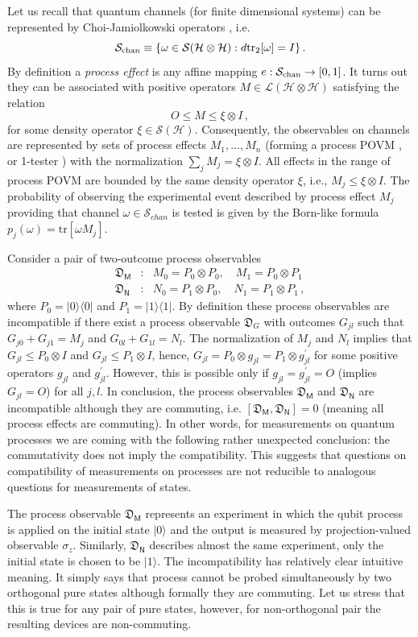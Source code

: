 \documentclass[12pt]{iopart}
\theoremstyle{definition}
\newcommand{\hi}{\mathcal{H}} %
\newcommand{\ket}[1]{|#1\rangle} %
\newcommand{\bra}[1]{\langle#1|} %
\renewcommand{\tr}[1]{\textrm{tr}\left[#1\right]} %
\newcommand{\Mo}{\mathsf{M}}%
\newcommand{\No}{\mathsf{N}}%
\newcommand{\Dev}{\mathfrak{D}} %
\begin{document}
{Let us recall that quantum channels (for finite dimensional systems) can be 
represented by Choi-Jamiolkowski operators \cite{MLQT12}, i.e. 
$$
\mathcal{S}_{\rm chan}\equiv\{\omega\in\mathcal{S}(\hi\otimes\hi): d{\rm tr}_2[\omega]=I\} \, .
$$
By definition a \emph{process effect} is any affine mapping 
$e:\mathcal{S}_{\rm chan}\to[0,1]$. It turns out \cite{Jencova12} 
they can be associated with positive operators $M\in \mathcal{L}(\hi\otimes\hi)$ satisfying the relation
$$
O\leq M\leq \xi\otimes I\,,
$$
for some density operator $\xi\in\mathcal{S}(\hi)$. Consequently, the
observables on channels are represented by sets of process effects 
$M_1,\dots,M_n$ (forming
a process POVM \cite{Ziman08a}, or 1-tester \cite{ChDaPe09pra}) 
with the normalization $\sum_j M_j=\xi\otimes I$.
All effects in the range of process POVM are bounded by the same density operator 
$\xi$, i.e., $M_j\leq\xi\otimes I$. 
The probability of observing 
the experimental event described by process effect $M_j$ providing that 
channel $\omega\in\mathcal{S}_{chan}$ is tested is given by the Born-like 
formula $p_j(\omega)=\tr{\omega M_j}$.

Consider a pair of two-outcome process observables 
\begin{eqnarray}
\nonumber 
\Dev_\Mo&:& M_0=P_0\otimes P_0,\quad M_1=P_0\otimes P_1 \\
\Dev_\No&:& N_0=P_1\otimes P_0,\quad N_1=P_1\otimes P_1\,,
\end{eqnarray} 
where $P_0=\ket{0}\bra{0}$
and $P_1=\ket{1}\bra{1}$. By definition these process 
observables are incompatible if there exist a process observable 
$\Dev_G$ with outcomes $G_{jl}$ such that $G_{j0}+G_{j1}=M_j$ and 
$G_{0l}+G_{1l}=N_l$. The normalization of $M_j$ and $N_l$
implies that $G_{jl}\leq P_0\otimes I$ and $G_{jl}\leq P_1\otimes I$,
hence, $G_{jl}=P_0\otimes g_{jl}=P_1\otimes g_{jl}^\prime$ for some
positive operators $g_{jl}$ and $g_{jl}^\prime$. However, this is 
possible only if $g_{jl}=g_{jl}^\prime=O$ (implies $G_{jl}=O$) for 
all $j,l$. In conclusion, the process observables $\Dev_\Mo$ and $\Dev_\No$
are incompatible although they are commuting, i.e. $[\Dev_\Mo,\Dev_\No]=0$
(meaning all process effects are commuting).
In other words, for measurements on quantum processes we are coming
with the following rather unexpected conclusion: the commutativity 
does not imply the compatibility. This suggests that questions on 
compatibility of measurements on processes are not reducible to 
analogous questions for measurements of states.

The process observable $\Dev_\Mo$ represents an experiment in which the qubit 
process is applied on the initial state $\ket{0}$ and the output 
is measured by projection-valued observable $\sigma_z$. Similarly,
$\Dev_\No$ describes almost the same experiment, only the initial state 
is chosen to be $\ket{1}$. The incompatibility has relatively clear 
intuitive meaning. It simply says that process cannot be probed
simultaneously by two orthogonal pure states although formally 
they are commuting. Let us stress that this is true for any pair
of pure states, however, for non-orthogonal pair the resulting 
devices are non-commuting.

}
\end{document}

